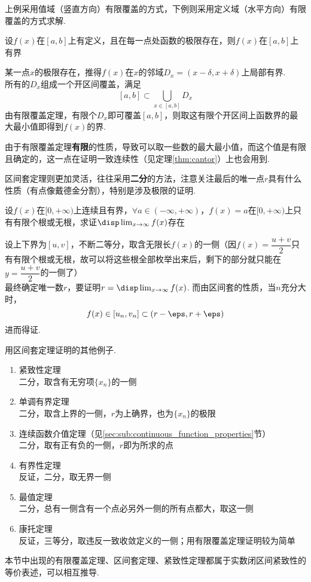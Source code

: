 \par 上例采用值域（竖直方向）有限覆盖的方式，下例则采用定义域（水平方向）有限覆盖的方式求解.
\begin{example}
设$f(x)$在$[a,b]$上有定义，且在每一点处函数的极限存在，则$f(x)$在$[a,b]$上有界
\end{example}
\begin{analysis}
某一点$x$的极限存在，推得$f(x)$在$x$的邻域$D_x=(x-\delta,x+\delta)$上局部有界.\\
所有的$D_x$组成一个开区间覆盖，满足
\[[a,b]\subset\bigcup_{x\in[a,b]}D_x\]
由有限覆盖定理，有限个$D_x$即可覆盖$[a,b]$，则取这有限个开区间上函数界的最大最小值即得到$f(x)$的界.
\end{analysis}
\par 由于有限覆盖定理\textbf{有限}的性质，导致可以取一些数的最大最小值，而这个值是有限且确定的，这一点在证明一致连续性（见定理\ref{thm:cantor}）上也会用到.
\par 区间套定理则更加灵活，往往采用\textbf{二分}的方法，注意关注最后的唯一点$r$具有什么性质（有点像戴德金分割），特别是涉及极限的证明.
\begin{example}
设$f(x)$在$[0,+\infty)$上连续且有界，$\forall a\in(-\infty,+\infty)$，$f(x)=a$在$[0,+\infty)$上只有有限个根或无根，求证$\disp\lim_{x\to\infty}f(x)$存在
\end{example}
\begin{analysis}
设上下界为$[u,v]$，不断二等分，取含无限长$f(x)$的一侧（因$f(x)=\dfrac{u+v}{2}$只有有限个根或无根，故可以将这些根全部枚举出来后，剩下的部分就只能在$y=\dfrac{u+v}{2}$的一侧了）\\
最终确定唯一数$r$，要证明$r=\disp\lim_{x\to\infty}f(x)$.
而由区间套的性质，当$n$充分大时，
\[f(x)\in[u_n,v_n]\subset(r-\eps,r+\eps)\]
进而得证.
\end{analysis}
\par 用区间套定理证明的其他例子.
\begin{example}
\begin{enumerate}
	\item 紧致性定理\\
	二分，取含有无穷项$\{x_n\}$的一侧
	\item 单调有界定理\\
	二分，取含上界的一侧，$r$为上确界，也为$\{x_n\}$的极限
	\item 连续函数介值定理（见\ref{sec:sub:continuous_function_properties}节）\\
	二分，取有正有负的一侧，$r$即为所求的点
	\item 有界性定理\\
	反证，二分，取无界一侧
	\item 最值定理\\
	二分，总有一侧含有一个点必另外一侧的所有点都大，取这一侧
	\item 康托定理\\
	反证，三等分，取违反一致收敛定义的一侧；用有限覆盖定理证明较为简单
\end{enumerate}
\end{example}
\par 本节中出现的有限覆盖定理、区间套定理、紧致性定理都属于实数闭区间紧致性的等价表述，可以相互推导.

